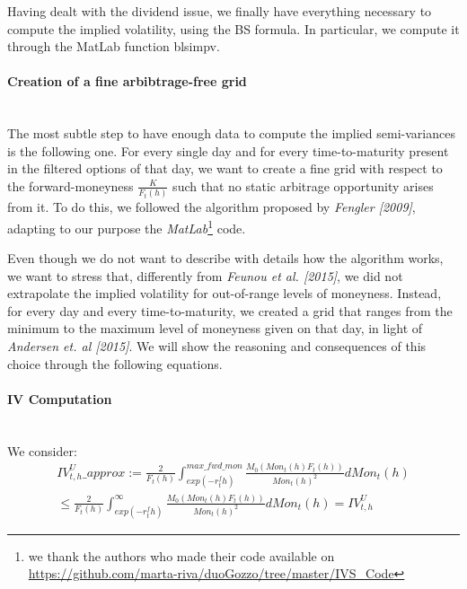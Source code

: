 \vspace{4mm}
Having dealt with the dividend issue,  we finally have everything necessary to compute the implied volatility, using the BS formula. In particular, we compute it through the MatLab function blsimpv.

\paragraph{Creation of a fine arbibtrage-free grid}\mbox{}\\
The most subtle step to have enough data to compute the implied semi-variances is the following one.
For every single day and for every time-to-maturity present in the filtered options of that day, we want to create a fine grid with respect to the forward-moneyness $\frac{K}{F_t(h)}$ such that no static arbitrage opportunity arises from it. To do this, we followed the algorithm proposed by \textit{Fengler [2009]}, adapting to our purpose the \textit{MatLab}\footnote{we thank the authors who made their code available on \url{https://github.com/marta-riva/duoGozzo/tree/master/IVS_Code}} code. 

\vspace{4mm}
Even though we do not want to describe with details how the algorithm works, we want to stress that, differently from \textit{Feunou et al. [2015]}, we did not extrapolate the implied volatility for out-of-range levels of moneyness. Instead, for every day and every time-to-maturity, we created a grid that ranges from the minimum to the maximum level of moneyness given on that day, in light of \textit{Andersen et. al [2015]}. We will show the reasoning and consequences of this choice through the following equations.

\paragraph{IV Computation}\mbox{}\\
We consider:
\begin{equation}
 \begin{split}
 IV_{t,h}^{U}\_approx:= \frac{2}{F_{t}(h)} \int_{exp(-r_{t}^{f}h)}^{max\_fwd\_mon} \frac{M_{0}(Mon_t(h)F_{t}(h))}{Mon_t(h)^{2}} dMon_t(h)\\
 \le \frac{2}{F_{t}(h)} \int_{exp(-r_{t}^{f}h)}^{\infty} \frac{M_{0}(Mon_t(h)F_{t}(h))}{Mon_t(h)^{2}} d Mon_t(h)=IV_{t,h}^{U}
 \end{split}
 \end{equation}
 
